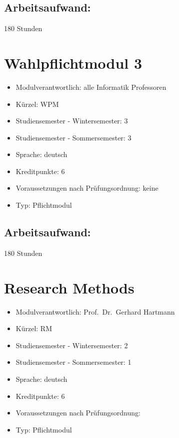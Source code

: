 \section*{Arbeitsaufwand:}\label{arbeitsaufwand-7}

180 Stunden

\chapter{Wahlpflichtmodul 3}\label{wahlpflichtmodul-3}

\begin{itemize}
\tightlist
\item
  Modulverantwortlich: alle Informatik Professoren
\item
  Kürzel: WPM
\item
  Studiensemester - Wintersemester: 3
\item
  Studiensemester - Sommersemester: 3
\item
  Sprache: deutsch
\item
  Kreditpunkte: 6
\item
  Voraussetzungen nach Prüfungsordnung: keine
\item
  Typ: Pflichtmodul
\end{itemize}

\section*{Arbeitsaufwand:}\label{arbeitsaufwand-8}

180 Stunden

\chapter{Research Methods}\label{research-methods}

\begin{itemize}
\tightlist
\item
  Modulverantwortlich: Prof.~Dr.~Gerhard Hartmann
\item
  Kürzel: RM
\item
  Studiensemester - Wintersemester: 2
\item
  Studiensemester - Sommersemester: 1
\item
  Sprache: deutsch
\item
  Kreditpunkte: 6
\item
  Voraussetzungen nach Prüfungsordnung:
\item
  Typ: Pflichtmodul
\end{itemize}

